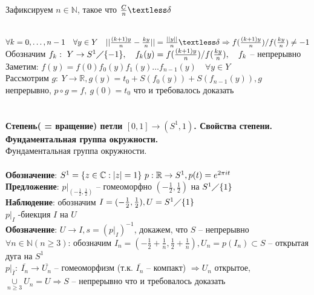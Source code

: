 	Зафиксируем $n\in \mathbb{N}$, такое что $\frac{C}{n} \textless \delta$\\
	\begin{figure}[h]
	\end{figure}\\
	$\forall k = 0, \ldots , n-1\quad \forall y\in Y\quad || \frac{(k+1)y}{n} - \frac{ky}{n}|| = \frac{||y||}{n} \textless \delta \Rightarrow f(\frac{(k+1)y}{n})\slash f(\frac{ky}{n}) \neq -1$\\
	Обозначим $f_k:\ Y \rightarrow S^1 \diagup \{-1\},\quad f_k (y) = f(\frac{(k+1)y}{n})\slash f(\frac{ky}{n}),\quad f_k$ -- непрерывно\\
	Заметим: $f(y) = f(0) f_0 (y) f_1 (y) \ldots  f_{n-1} (y)\quad \forall y\in Y$\\
	Рассмотрим $g:\ Y\rightarrow \mathbb{R}, g(y) = t_0 + S(f_0 (y)) + S(f_{n-1} (y)), g$ непрерывно, $p \circ g = f,\ g(0) = t_0$ что и требовалось доказать



\newpage
	\section{} 
	\textbf{Степень( = вращение) петли $[0,1] \rightarrow (S^1, 1)$. Свойства степени. Фундаментальная группа окружности.}\\
	Фундаментальная группа окружности.\\
	\\
	\textbf{Обозначение}: $S^1 = \{ z\in \mathbb{C}: |z| = 1\}\\\
	p: \mathbb{R} \rightarrow S^1, p(t) = e^{2\pi it}$\\
	\textbf{Предложение}: ${p|}_{(- \frac{1}{2}, \frac{1}{2})}$ -- гомеоморфно $(- \frac{1}{2}, \frac{1}{2})$ на $S^1 \diagup \{1\}$\\
	\textbf{Наблюдение}: обозначим $I = (- \frac{1}{2}, \frac{1}{2}), U = S^1 \diagup \{1\}$\\
	${p|}_I$ -биекция $I$ на $U$\\
	\textbf{Обозначение}: $U \rightarrow I, s = ({p|}_I)^{-1}$, докажем, что $S$ -- непрерывно\\
	$\forall n\in \mathbb{N} (n \geq 3)$: обозначим $I_n = (- \frac{1}{2} + \frac{1}{n}, \frac{1}{2}+ \frac{1}{n}), U_n = p(I_n) \subset S$ -- открытая дуга на $S^1$\\
	${p|}_{\overline{I}}:\ \overline{I_n} \rightarrow \overline{U_n}$ -- гомеоморфизм (т.к. $\overline{I_n}$ -- компакт) $\Rightarrow U_n$ открытое, $\underset{n \geq 3}{\cup} U_n = U \Rightarrow S$ -- непрерывно что и требовалось доказать\\
	
